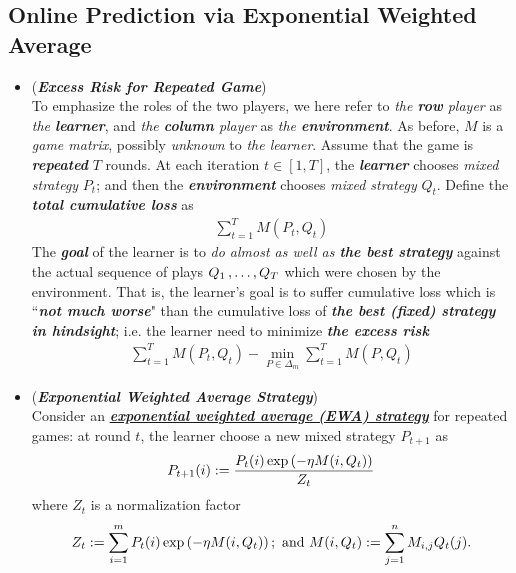 \documentclass[11pt]{article}
\begin{document}
\subsection{Online Prediction via Exponential Weighted Average}
\begin{itemize}
\item \begin{remark}(\textbf{\emph{Excess Risk for Repeated Game}})\\
To emphasize the roles of the two players, we here refer to \emph{the \textbf{row} player} as \emph{the \textbf{learner}}, and \emph{the \textbf{column} player} as \emph{the \textbf{environment}}. As before, $M$ is a \emph{game matrix}, possibly \emph{unknown} to \emph{the learner}. Assume that the game is \emph{\textbf{repeated}} $T$ rounds. At each iteration $t \in [1, T]$, the \emph{\textbf{learner}} chooses \emph{mixed strategy} $P_t$; and then the \emph{\textbf{environment}} chooses \emph{mixed strategy} $Q_t$. Define the \emph{\textbf{total cumulative loss}} as
\begin{align*}
 \sum_{t=1}^{T}M(P_t, Q_t) 
\end{align*} 
The \emph{\textbf{goal}} of the learner is to \emph{do almost as well as \textbf{the best strategy}} against the actual sequence of plays $Q_1 \,{,}\ldots{,}\, Q_T$ which were chosen by the environment. That is, the learner's goal is to suffer cumulative loss which is ``\emph{\textbf{not much worse}}" than the cumulative loss of \emph{\textbf{the best (fixed) strategy in hindsight}}; i.e. the learner need to minimize \emph{\textbf{the excess risk}}
\begin{align}
\sum_{t=1}^{T}M(P_t, Q_t)  - \min_{P \in \Delta_m}\sum_{t=1}^{T}M(P, Q_t) \label{def: excess_risk_two_player_seq_game}
\end{align} 
\end{remark}


\item \begin{remark}(\textbf{\emph{Exponential Weighted Average Strategy}}) \citep{cesa2006prediction, schapire2012boosting} \\
Consider an \underline{\emph{\textbf{exponential weighted average (EWA) strategy}}} for repeated games: at round $t$, the learner choose a new mixed strategy $P_{t+1}$ as
\begin{align*}
P_{t+1}(i) := \frac{P_{t}(i) \exp\left(- \eta M(i, Q_t)\right)}{Z_t}
\end{align*} where $Z_t$ is a normalization factor
\begin{align*}
Z_t := \sum_{i=1}^{m}P_{t}(i) \exp\left(- \eta M(i, Q_t)\right); \text{ and } M(i, Q_t) := \sum_{j=1}^{n}M_{i,j}Q_t(j).
\end{align*}
\end{remark}


\end{itemize}
\end{document}
